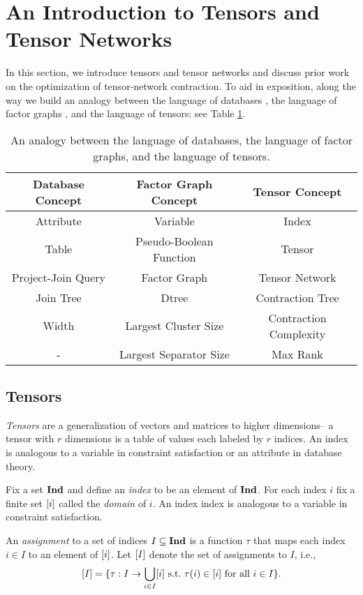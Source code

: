 \section{An Introduction to Tensors and Tensor Networks}
\label{sec:tensors:tensors}
In this section, we introduce tensors and tensor networks and discuss prior work on the optimization of tensor-network contraction. To aid in exposition, along the way we build an analogy between the language of databases \cite{SG88}, the language of factor graphs \cite{KFL01,dechter99,darwiche01b}, and the language of tensors: see Table \ref{table:db-tensor-analogy}.

\begin{table}[t]
\centering
\begin{tabular}{c|c|c}
\hline
\textbf{Database Concept} & \textbf{Factor Graph Concept} & \textbf{Tensor Concept}\\ \hline
Attribute & Variable & Index\\
Table & Pseudo-Boolean Function & Tensor\\
Project-Join Query & Factor Graph & Tensor Network\\
Join Tree & Dtree & Contraction Tree\\ 
Width & Largest Cluster Size & Contraction Complexity \\
- & Largest Separator Size & Max Rank \\ \hline
\end{tabular}
\caption{\label{table:db-tensor-analogy} An analogy between the language of databases, the language of factor graphs, and the language of tensors.}
\end{table}

\subsection{Tensors}
\emph{Tensors} are a generalization of vectors and matrices to higher dimensions-- a tensor with $r$ dimensions is a table of values each labeled by $r$ indices. An index is analogous to a variable in constraint satisfaction or an attribute in database theory. 

Fix a set $\mathbf{Ind}$ and define an \emph{index} to be an element of $\mathbf{Ind}$. For each index $i$ fix a finite set $[i]$ called the \emph{domain} of $i$. An index index is analogous to a variable in constraint satisfaction. %

An \emph{assignment} to a set of indices $I \subseteq \mathbf{Ind}$ is a function $\tau$ that maps each index $i \in I$ to an element of $[i]$. Let $[I]$ denote the set of assignments to $I$, i.e., $$[I] = \{\tau: I \rightarrow \bigcup_{i \in I} [i]~\text{s.t.}~\tau(i) \in [i]~\text{for all}~i \in I\}.$$


